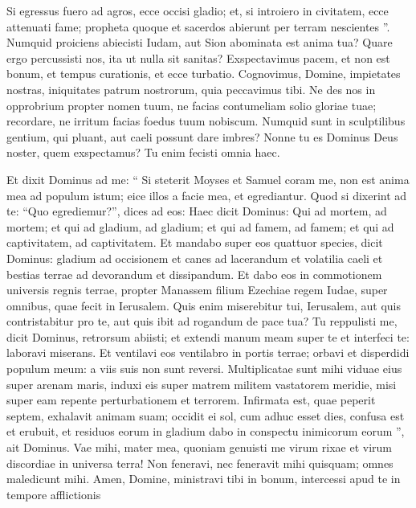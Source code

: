 \begin{biblechapter}
\begin{biblechapter}
\begin{biblechapter}
\begin{biblechapter}
\begin{biblechapter}
\begin{biblechapter}
\begin{biblechapter}
\begin{biblechapter}
\begin{biblechapter}
\begin{biblechapter}
\begin{biblechapter}
\begin{biblechapter}
\begin{biblechapter}
\begin{biblechapter}
 \verse Si egressus fuero ad agros,
 ecce occisi gladio;
 et, si introiero in civitatem,
 ecce attenuati fame;
 propheta quoque et sacerdos
 abierunt per terram nescientes ”.
 \verse Numquid proiciens abiecisti Iudam,
 aut Sion abominata est anima tua?
 Quare ergo percussisti nos,
 ita ut nulla sit sanitas?
 Exspectavimus pacem, et non est bonum,
 et tempus curationis, et ecce turbatio.
 \verse Cognovimus, Domine, impietates nostras,
 iniquitates patrum nostrorum, quia peccavimus tibi.
 \verse Ne des nos in opprobrium propter nomen tuum,
 ne facias contumeliam solio gloriae tuae;
 recordare, ne irritum facias foedus tuum nobiscum.
 \verse Numquid sunt in sculptilibus gentium, qui pluant,
 aut caeli possunt dare imbres?
 Nonne tu es Dominus Deus noster,
 quem exspectamus?
 Tu enim fecisti omnia haec.
 
\begin{biblechapter}
\verse Et dixit Dominus ad me: “ Si steterit Moyses et Samuel coram me, non est anima mea ad populum istum; eice illos a facie mea, et egrediantur. 
\verse Quod si dixerint ad te: “Quo egrediemur?”, dices ad eos: Haec dicit Dominus:
 Qui ad mortem, ad mortem;
 et qui ad gladium, ad gladium;
 et qui ad famem, ad famem;
 et qui ad captivitatem, ad captivitatem.
 \verse Et mandabo super eos quattuor species, dicit Dominus: gladium ad occisionem et canes ad lacerandum et volatilia caeli et bestias terrae ad devorandum et dissipandum. 
\verse Et dabo eos in commotionem universis regnis terrae, propter Manassem filium Ezechiae regem Iudae, super omnibus, quae fecit in Ierusalem.
 \verse Quis enim miserebitur tui, Ierusalem,
 aut quis contristabitur pro te,
 aut quis ibit ad rogandum de pace tua?
 \verse Tu reppulisti me,
 dicit Dominus,
 retrorsum abiisti;
 et extendi manum meam super te et interfeci te:
 laboravi miserans.
 \verse Et ventilavi eos ventilabro
 in portis terrae;
 orbavi et disperdidi populum meum:
 a viis suis non sunt reversi.
 \verse Multiplicatae sunt mihi viduae eius
 super arenam maris,
 induxi eis super matrem
 militem vastatorem meridie,
 misi super eam repente
 perturbationem et terrorem.
 \verse Infirmata est, quae peperit septem,
 exhalavit animam suam;
 occidit ei sol, cum adhuc esset dies,
 confusa est et erubuit,
 et residuos eorum in gladium dabo
 in conspectu inimicorum eorum ”,
 ait Dominus.
 \verse Vae mihi, mater mea,
 quoniam genuisti me virum rixae
 et virum discordiae in universa terra!
 Non feneravi, nec feneravit mihi quisquam;
 omnes maledicunt mihi.
 \verse Amen, Domine, ministravi tibi in bonum,
 intercessi apud te in tempore afflictionis

\end{biblechapter}
\end{biblechapter}
\end{biblechapter}
\end{biblechapter}
\end{biblechapter}
\end{biblechapter}
\end{biblechapter}
\end{biblechapter}
\end{biblechapter}
\end{biblechapter}
\end{biblechapter}
\end{biblechapter}
\end{biblechapter}
\end{biblechapter}
\end{biblechapter}
